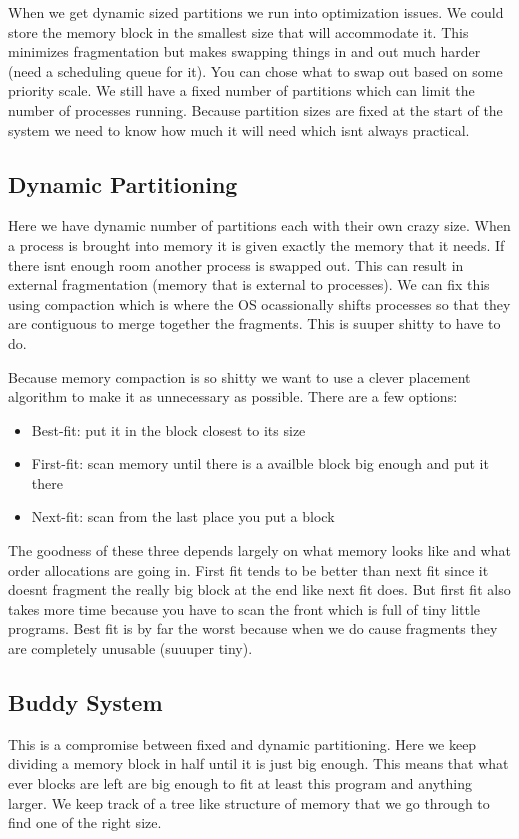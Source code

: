 \documentclass[12pt]{article}
\begin{document}
When we get dynamic sized partitions we run into optimization issues. We could store the memory block in the smallest size that will accommodate it. This minimizes fragmentation but makes swapping things in and out much harder (need a scheduling queue for it). You can chose what to swap out based on some priority scale. We still have a fixed number of partitions which can limit the number of processes running. Because partition sizes are fixed at the start of the system we need to know how much it will need which isnt always practical.

\subsection{Dynamic Partitioning}
Here we have dynamic number of partitions each with their own crazy size. When a process is brought into memory it is given exactly the memory that it needs. If there isnt enough room another process is swapped out. This can result in external fragmentation (memory that is external to processes). We can fix this using compaction which is where the OS ocassionally shifts processes so that they are contiguous to merge together the fragments. This is suuper shitty to have to do.

Because memory compaction is so shitty we want to use a clever placement algorithm to make it as unnecessary as possible. There are a few options:
\begin{itemize}
  \item Best-fit: put it in the block closest to its size
  \item First-fit: scan memory until there is a availble block big enough and put it there
  \item Next-fit: scan from the last place you put a block
\end{itemize}
The goodness of these three depends largely on what memory looks like and what order allocations are going in. First fit tends to be better than next fit since it doesnt fragment the really big block at the end like next fit does. But first fit also takes more time because you have to scan the front which is full of tiny little programs. Best fit is by far the worst because when we do cause fragments they are completely unusable (suuuper tiny).

\subsection{Buddy System}
This is a compromise between fixed and dynamic partitioning. Here we keep dividing a memory block in half until it is just big enough. This means that what ever blocks are left are big enough to fit at least this program and anything larger. We keep track of a tree like structure of memory that we go through to find one of the right size.
\end{document}
